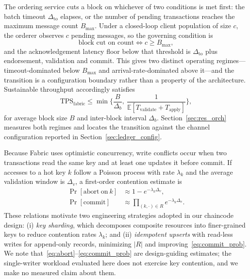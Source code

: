 \documentclass[final,5p,times,twocolumn]{elsarticle}
\begin{document}
The ordering service cuts a block on whichever of two conditions is met first: the batch timeout $\Delta_{\mathrm{to}}$ elapses, or the number of pending transactions reaches the maximum message count $B_{\max}$. Under a closed-loop client population of size $c$, the orderer observes $c$ pending messages, so the governing condition is
\begin{equation}
  \text{block cut on count} \iff c \ge B_{\max},
  \label{eq:block_cut}
\end{equation}
and the acknowledgement latency floor below that threshold is $\Delta_{\mathrm{to}}$ plus endorsement, validation and commit. This gives two distinct operating regimes---timeout-dominated below $B_{\max}$ and arrival-rate-dominated above it---and the transition is a configuration boundary rather than a property of the architecture. Sustainable throughput accordingly satisfies
\begin{equation}
\mathrm{TPS}_{\mathrm{fabric}}
 \le
 \min\!\Big\{\frac{B}{\Delta_b},\
                 \frac{1}{\mathbb{E}[T_{\mathrm{validate}}+T_{\mathrm{apply}}]}\Big\},
\label{eq:tps_fabric}
\end{equation}
for average block size $B$ and inter-block interval $\Delta_b$. Section~\ref{sec:res_orch} measures both regimes and locates the transition against the channel configuration reported in Section~\ref{sec:ledger_config}.

Because Fabric uses optimistic concurrency, write conflicts occur when two transactions read the same key and at least one updates it before commit. If accesses to a hot key $k$ follow a Poisson process with rate $\lambda_k$ and the average validation window is $\Delta_v$, a first-order contention estimate is
\begin{subequations}
\begin{align}
\Pr[\mathrm{abort\ on}\ k] &\approx 1 - e^{-\lambda_k\Delta_v}, \label{eq:abort}\\
\Pr[\mathrm{commit}]
   &\approx \prod_{(k,\cdot)\in R} e^{-\lambda_k\Delta_v}.
   \label{eq:commit_prob}
\end{align}
\end{subequations}
These relations motivate two engineering strategies adopted in our chaincode design: (i) \emph{key sharding}, which decomposes composite resources into finer-grained keys to reduce contention rates $\lambda_k$; and (ii) \emph{idempotent upserts} with read-less writes for append-only records, minimizing $|R|$ and improving~\eqref{eq:commit_prob}. We note that~\eqref{eq:abort}--\eqref{eq:commit_prob} are design-guiding estimates; the single-writer workload evaluated here does not exercise key contention, and we make no measured claim about them.
\end{document}
